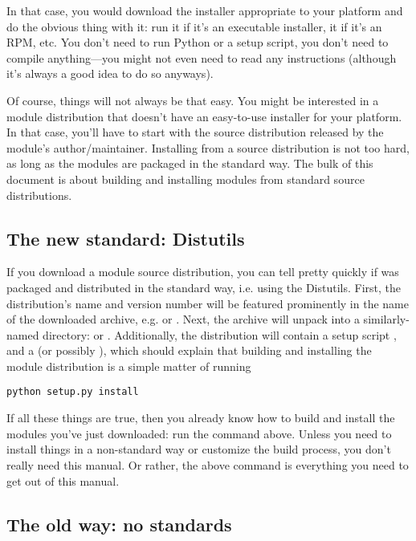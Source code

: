 \documentclass{howto}
\begin{document}
In that case, you would download the installer appropriate to your
platform and do the obvious thing with it: run it if it's an executable
installer,  it if it's an RPM, etc.  You don't need
to run Python or a setup script, you don't need to compile
anything---you might not even need to read any instructions (although
it's always a good idea to do so anyways).

Of course, things will not always be that easy.  You might be interested
in a module distribution that doesn't have an easy-to-use installer for
your platform.  In that case, you'll have to start with the source
distribution released by the module's author/maintainer.  Installing
from a source distribution is not too hard, as long as the modules are
packaged in the standard way.  The bulk of this document is about
building and installing modules from standard source distributions.


\subsection{The new standard: Distutils}
\label{sec:new-standard}

If you download a module source distribution, you can tell pretty
quickly if was packaged and distributed in the standard way, i.e. using
the Distutils.  First, the distribution's name and version number will
be featured prominently in the name of the downloaded archive, e.g.
 or .  Next, the archive
will unpack into a similarly-named directory:  or
.  Additionally, the distribution will contain a
setup script , and a  (or possibly
), which should explain that building and installing the
module distribution is a simple matter of running
\begin{verbatim}
python setup.py install
\end{verbatim}

If all these things are true, then you already know how to build and
install the modules you've just downloaded: run the command above.
Unless you need to install things in a non-standard way or customize the
build process, you don't really need this manual.  Or rather, the above
command is everything you need to get out of this manual.


\subsection{The old way: no standards}
\label{sec:old-way}
\end{document}
